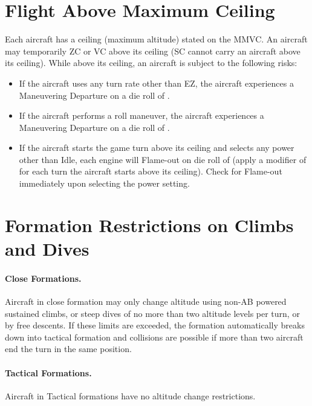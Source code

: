 \begin{advancedrules}
\section{Flight Above Maximum Ceiling}
\label{rule:flight-above-maximum-ceiling}

Each aircraft has a ceiling (maximum altitude) stated on the MMVC. An aircraft may temporarily ZC or VC above its ceiling (SC cannot carry an aircraft above its ceiling). While above its ceiling, an aircraft is subject to the following risks:

\begin{itemize}

    \item If the aircraft uses any turn rate other than EZ, the aircraft experiences a Maneuvering Departure on a die roll of .
    
    \item If the aircraft performs a roll maneuver, the aircraft experiences a Maneuvering Departure on a die roll of .

    \item If the aircraft starts the game turn above its ceiling and selects any power other than Idle, each engine will Flame-out on die roll of  (apply a modifier of  for each turn the aircraft starts above its ceiling). Check for Flame-out immediately upon selecting the power setting.

\end{itemize}

\section{Formation Restrictions on Climbs and Dives}

\paragraph{Close Formations.} Aircraft in close formation may only change altitude using non-AB powered sustained climbs, or steep dives of no more than two altitude levels per turn, or by free descents. If these limits are exceeded, the formation automatically breaks down into tactical formation and collisions are possible if more than two aircraft end the turn in the same position.

\paragraph{Tactical Formations.} Aircraft in Tactical formations have no altitude change restrictions.

\end{advancedrules}
